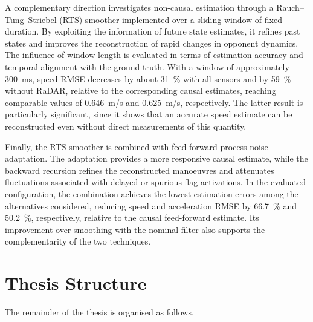 A complementary direction investigates non-causal estimation through a Rauch--Tung--Striebel (RTS) smoother implemented over a sliding window of fixed duration. By exploiting the information of future state estimates, it refines past states and improves the reconstruction of rapid changes in opponent dynamics. The influence of window length is evaluated in terms of estimation accuracy and temporal alignment with the ground truth. With a window of approximately \SI{300}{ms}, speed RMSE decreases by about \SI{31}{\percent} with all sensors and by \SI{59}{\percent} without RaDAR, relative to the corresponding causal estimates, reaching comparable values of \SI{0.646}{m/s} and \SI{0.625}{m/s}, respectively. The latter result is particularly significant, since it shows that an accurate speed estimate can be reconstructed even without direct measurements of this quantity.

Finally, the RTS smoother is combined with feed-forward process noise adaptation. The adaptation provides a more responsive causal estimate, while the backward recursion refines the reconstructed manoeuvres and attenuates fluctuations associated with delayed or spurious flag activations. In the evaluated configuration, the combination achieves the lowest estimation errors among the alternatives considered, reducing speed and acceleration RMSE by \SI{66.7}{\percent} and \SI{50.2}{\percent}, respectively, relative to the causal feed-forward estimate. Its improvement over smoothing with the nominal filter also supports the complementarity of the two techniques.

\section{Thesis Structure}
\label{sec:intro_structure}

The remainder of the thesis is organised as follows.

